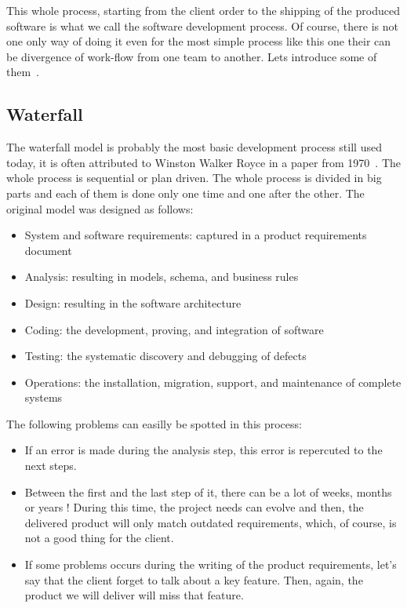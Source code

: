 \documentclass[12pt]{article}
\theoremstyle{definition}
\theoremstyle{definition}
\begin{document}
This whole process, starting from the client order to the shipping of the produced software is what we call the software development process. Of course, there is not one only way of doing it even for the most simple process like this one their can be divergence of work-flow from one team to another. Lets introduce some of them~\cite{IIS2:IIS202348}.

\subsection{Waterfall}

The waterfall model is probably the most basic development process still used today, it is often attributed to Winston Walker Royce in a paper from 1970~\cite{BARYWBoehm:1987}. The whole process is sequential or plan driven. The whole process is divided in big parts and each of them is done only one time and one after the other. The original model was designed as follows:\\

\begin{itemize}

\item System and software requirements: captured in a product requirements document
\item Analysis: resulting in models, schema, and business rules
\item Design: resulting in the software architecture
\item Coding: the development, proving, and integration of software
\item Testing: the systematic discovery and debugging of defects
\item Operations: the installation, migration, support, and maintenance of complete systems

\end{itemize}

The following problems can easilly be spotted in this process:

\begin{itemize}

\item If an error is made during the analysis step, this error is repercuted to the next steps.
\item Between the first and the last step of it, there can be a lot of weeks, months or years ! During this time, the project needs can evolve and then, the delivered product will only match outdated requirements, which, of course, is not a good thing for the client.
\item If some problems occurs during the writing of the product requirements, let's say that the client forget to talk about a key feature. Then, again, the product we will deliver will miss that feature.

\end{itemize}
\end{document}
